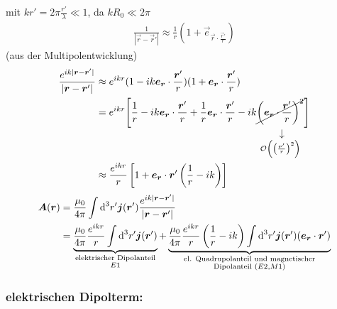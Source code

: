 mit $ k r' = 2 \pi \frac{r'}{\lambda} \ll 1 $, da $ k R_0 \ll 2 \pi $
\begin{align*}
\frac{1}{|\vec{r} - \vec{r}'|} \approx \frac{1}{r} ( 1 + \vec{e}_{\vec{r} \cdot \frac{\vec{r}'}{r}})
\end{align*}
(aus der Multipolentwicklung)
\begin{align*}
\frac{e^{i k |\vec{r} - \vec{r}'|}}{|\vec{r} - \vec{r}'|} &\approx e^{i k r} (1 - i k \vec{e}_{\vec{r}} \cdot \frac{\vec{r}'}{r}) (1 + \vec{e}_{\vec{r}} \cdot \frac{\vec{r}'}{r})\\
&= e^{i k r} \Bigg[\frac{1}{r} - i k \vec{e}_{\vec{r}} \cdot \frac{\vec{r}'}{r} + \frac{1}{r} \vec{e}_{\vec{r}} \cdot \frac{\vec{r}'}{r} - i k \custo{\rightarrow}{\cancel{\left(\vec{e}_{\vec{r}} \cdot \frac{\vec{r}'}{r}\right)^2}}{\mathcal{O} \left(\left(\frac{\vec{r}'}{r}\right)^2\right)}\Bigg]\\
&\approx \frac{e^{i k r}}{r} \left[1 + \vec{e}_{\vec{r}} \cdot \vec{r}' \left(\frac{1}{r} - i k\right)\right]
\end{align*}
\begin{align*}
\vec{A}(\vec{r}) &= \frac{\mu_0}{4 \pi} \int \dd^3 r' \vec{j}(\vec{r}') \frac{e^{i k |\vec{r} - \vec{r}'|}}{|\vec{r} - \vec{r}'|}\\
&= \ub{\frac{\mu_0}{4 \pi} \frac{e^{i k r}}{r} \int \dd^3 r' \vec{j} (\vec{r}')}_{\mathclap{\substack{\tx{elektrischer Dipolanteil} \\ E1}}} + \ub{\frac{\mu_0}{4 \pi} \frac{e^{i k r}}{r} \left(\frac{1}{r} - ik\right) \int \dd^3 r' \vec{j}(\vec{r}') (\vec{e}_{\vec{r}} \cdot \vec{r}')}_{\mathclap{\substack{\tx{el. Quadrupolanteil und magnetischer} \\ \tx{Dipolanteil } (E2, M1)}}}
\end{align*}

\subsubsection{elektrischen Dipolterm:}

